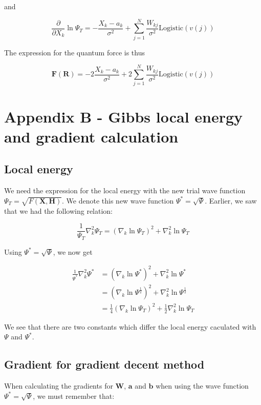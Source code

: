 \documentclass[norsk,a4paper,12pt]{article}
\begin{document}
and

\begin{equation}
\frac{\partial}{\partial X_k}\ln\Psi_T=-\frac{X_k-a_k}{\sigma^2}+\sum_{j=1}^{N}\frac{W_{kj}}{\sigma^2}\text{Logistic}(v(j))
\end{equation}

The expression for the quantum force is thus

\begin{equation}
\boldsymbol{F}(\boldsymbol{R})=-2\frac{X_k-a_k}{\sigma^2}+2\sum_{j=1}^{N}\frac{W_{kj}}{\sigma^2}\text{Logistic}(v(j))
\end{equation}



\section{Appendix B - Gibbs local energy and gradient calculation} \label{sec:appendix_B}

\subsection{Local energy}
We need the expression for the local energy with the new trial wave function $\Psi_T = \sqrt{F(\boldsymbol{X}, \boldsymbol{H})}$. We denote this new wave function $\Psi ^* = \sqrt{\Psi}$. Earlier, we saw that we had the following relation:

\begin{equation}
\frac{1}{\Psi_T}\nabla_k^2\Psi_T = (\nabla_k\ln\Psi_T)^2+\nabla_k^2\ln\Psi_T
\end{equation}

Using $\Psi ^* = \sqrt{\Psi}$, we now get

\begin{align}
	\frac{1}{\Psi ^*}\nabla_k^2\Psi ^*
	&= (\nabla_k \ln \Psi ^*)^2 + \nabla_k^2 \ln \Psi ^* \\
	&= (\nabla_k \ln \Psi^{\frac{1}{2}})^2 + \nabla_k^2 \ln \Psi^{\frac{1}{2}} \\
	&= \frac{1}{4}(\nabla_k\ln\Psi_T)^2 + \frac{1}{2}\nabla_k^2\ln\Psi_T
\end{align}

We see that there are two constants which differ the local energy caculated with $\Psi$ and $\Psi ^*$. 

\subsection{Gradient for gradient decent method}
When calculating the gradients for $\boldsymbol{W}$, $\boldsymbol{a}$ and $\boldsymbol{b}$ when using the wave function $\Psi ^* = \sqrt{\Psi}$, we must remember that:
\end{document}
